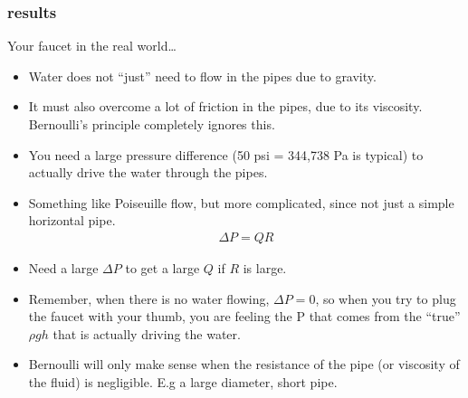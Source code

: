 \documentclass[aspectratio=169,
hyperref={colorlinks,urlcolor=blue}
]{beamer}
\begin{document}
\subsubsection{results}
\label{subsubsec:results}
\begin{frame}{Your faucet in the real world…}
\begin{itemize}
\item Water does not ``just'' need to flow in the pipes due to gravity. 
\item It must also overcome a lot of friction in the pipes, due to its viscosity. Bernoulli’s principle completely ignores this.
\item You need a large pressure difference (50 psi  = 344,738 Pa is typical) to actually drive the water through the pipes. 
\item Something like Poiseuille flow, but more complicated, since not just a simple horizontal pipe. 
\begin{align*}
\Delta P =QR
\end{align*}
\item Need a large $\Delta P$ to get a large $Q$ if $R$ is large.
\item Remember, when there is no water flowing, $\Delta P=0$, so when you try to plug the faucet with your thumb, you are feeling the P that comes from the ``true'' $\rho g h$  that is actually driving the water. 
\item Bernoulli will only make sense when the resistance of the pipe (or viscosity of the fluid) is negligible. E.g a large diameter, short pipe. 
\end{itemize}

\end{frame}






















\end{document}
